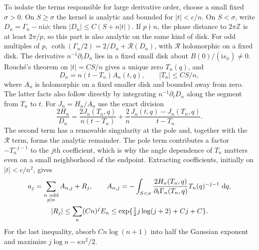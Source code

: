 \documentclass[11pt]{article}
\numberwithin{equation}{section}
\theoremstyle{definition}
\newcommand{\ii}{\mathrm i}
\newcommand{\dd}{\,\mathrm d}
\begin{document}
To isolate the terms responsible for large derivative order, choose a
small fixed $\sigma>0$.  On $S\ge\sigma$ the kernel is
analytic and bounded for $|t|<c/n$.  On $S<\sigma$, write
$D_n=\Gamma_n-n\ii\phi$; then $|D_n|\le C(S+n|t|)$.
If $p\nmid n$, the phase distance to $2\pi\mathbb Z$ is at least
$2\pi/p$, so this part is also analytic on the same kind of disk.
For odd multiples of $p$,
$\coth(\Gamma_n/2)=2/D_n+\mathcal R(D_n)$, with $\mathcal R$
holomorphic on a fixed disk.  The derivative
$n^{-1}\partial_tD_n$ lies in a fixed small disk about
$B(0)/(\ii s_\phi)\ne0$.  Rouch\'e's theorem on
$|t|=CS/n$ gives a unique zero $T_n(q)$, and
\[
 D_n=n(t-T_n)A_n(t,q),\qquad |T_n|\le CS/n,
\]
where $A_n$ is holomorphic on a fixed smaller disk and bounded away
from zero.  The latter facts also follow directly by integrating
$n^{-1}\partial_tD_n$ along the segment from $T_n$ to $t$.
For $J_n=H_n/A_n$ use the exact division
\[
 \frac{2H_n}{D_n}=
 \frac{2J_n(T_n,q)}{n(t-T_n)}+
 \frac2n\frac{J_n(t,q)-J_n(T_n,q)}{t-T_n}.
\]
The second term has a removable singularity at the pole and, together
with the $\mathcal R$ term, forms the analytic remainder. The pole
term contributes a factor $-T_n^{-j-1}$ to the $j$th coefficient,
which is why the angle dependence of $T_n$ matters even on a small
neighborhood of the endpoint.
Extracting coefficients, initially on $|t|<c/n^2$, gives
\begin{gather}
 a_j=\sum_{\substack{n\ {\rm odd}\\p\mid n}} A_{n,j}+R_j,\qquad
 A_{n,j}=-\int_{S<\sigma}
      \frac{2H_n(T_n,q)}{\partial_t\Gamma_n(T_n,q)}
                          T_n(q)^{-j-1}\,\dd q,\label{neg:new:poles}\\
 |R_j|\le \sum_n(Cn)^jE_n
       \le\exp\{\tfrac12j\log(j+2)+Cj+C\}.             \label{neg:new:remainder}
\end{gather}
For the last inequality, absorb $Cn\log(n+1)$ into half the Gaussian
exponent and maximize $j\log n-\kappa n^2/2$.
\end{document}
